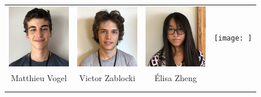 \begin{center}
\begin{tabular}{cccc}
\includegraphics[angle=270,origin=c, width=27mm]{eleves/Vogel Matthieu.JPG} &
\includegraphics[angle=270,origin=c, width=27mm]{eleves/Zablocki Victor.JPG} &
\includegraphics[angle=270,origin=c, width=27mm]{eleves/Zheng Elisa.JPG} &
\texttt{[image: ]} \\
Matthieu Vogel & Victor Zablocki & Élisa Zheng & \\ \\ \\ 

\end{tabular}
\end{center}